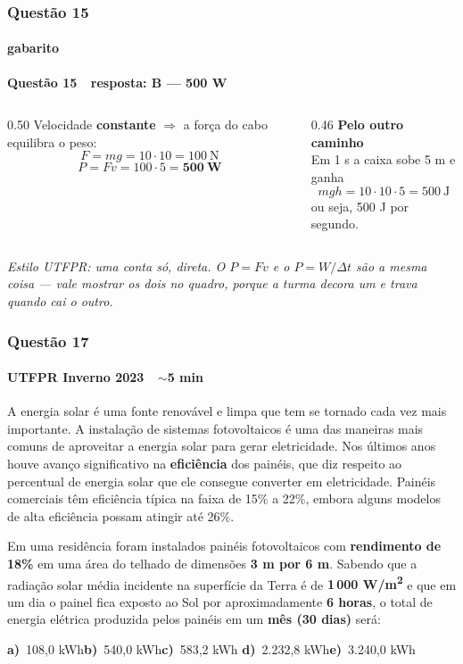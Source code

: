 \documentclass[aspectratio=169,12pt]{beamer}
\newcommand{\alternativascurtas}[5]{%
  \par\vspace{0.7em}%
  \noindent\textbf{a)}~#1\hfill\textbf{b)}~#2\hfill\textbf{c)}~#3%
  \hfill\textbf{d)}~#4\hfill\textbf{e)}~#5\par}
\newcommand{\resposta}[2]{%
  \par\vspace{0.2em}
  {\Large\bfseries\color{vinho}Quest\~ao #1 \,\textemdash\, resposta: #2}
  \par\vspace{0.6em}}
\begin{document}
\begin{frame}
\frametitle{Quest\~ao 15}
\framesubtitle{gabarito}
\resposta{15}{B --- 500 W}

\begin{columns}[T]
\begin{column}{0.50\textwidth}
Velocidade \textbf{constante} $\Rightarrow$ a for\c{c}a do cabo
equilibra o peso:
\[ F = mg = 10\cdot 10 = 100\ \text{N} \]
\[ P = F v = 100\cdot 5 = \mathbf{500\ W} \]
\end{column}
\begin{column}{0.46\textwidth}
\textbf{Pelo outro caminho}\\
Em 1 s a caixa sobe 5 m e ganha
\[ mgh = 10\cdot 10\cdot 5 = 500\ \text{J} \]
ou seja, 500 J por segundo.
\end{column}
\end{columns}

\vspace{0.6em}
{\color{grafite}\itshape Estilo UTFPR: uma conta s\'o, direta. O
$P = Fv$ e o $P = W/\Delta t$ s\~ao a mesma coisa --- vale mostrar os
dois no quadro, porque a turma decora um e trava quando cai o outro.}
\end{frame}

\begin{frame}
\frametitle{Quest\~ao 17}
\framesubtitle{UTFPR Inverno 2023 \,\textperiodcentered\, $\sim$5 min}

\footnotesize\linespread{0.98}\selectfont
A energia solar \'e uma fonte renov\'avel e limpa que tem se tornado
cada vez mais importante. A instala\c{c}\~ao de sistemas fotovoltaicos
\'e uma das maneiras mais comuns de aproveitar a energia solar para
gerar eletricidade. Nos \'ultimos anos houve avan\c{c}o significativo
na \textbf{efici\^encia} dos pain\'eis, que diz respeito ao percentual
de energia solar que ele consegue converter em eletricidade. Pain\'eis
comerciais t\^em efici\^encia t\'ipica na faixa de 15\% a 22\%, embora
alguns modelos de alta efici\^encia possam atingir at\'e 26\%.

\vspace{0.4em}
\small
Em uma resid\^encia foram instalados pain\'eis fotovoltaicos com
\textbf{rendimento de 18\%} em uma \'area do telhado de dimens\~oes
\textbf{3 m por 6 m}. Sabendo que a radia\c{c}\~ao solar m\'edia
incidente na superf\'icie da Terra \'e de
\textbf{1\,000 W/m\textsuperscript{2}} e que em um dia o painel fica
exposto ao Sol por aproximadamente \textbf{6 horas}, o total de energia
el\'etrica produzida pelos pain\'eis em um \textbf{m\^es (30 dias)}
ser\'a:

\alternativascurtas{108,0 kWh}{540,0 kWh}{583,2 kWh}{2.232,8 kWh}%
{3.240,0 kWh}
\end{frame}
\end{document}
